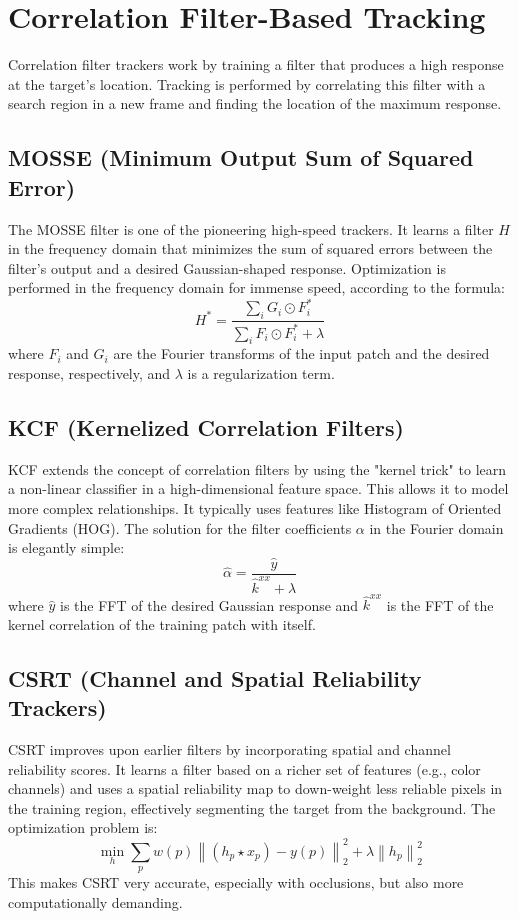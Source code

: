 \documentclass[12pt, a4paper]{report}
\begin{document}
\section{Correlation Filter-Based Tracking}
Correlation filter trackers work by training a filter that produces a high response at the target's location. Tracking is performed by correlating this filter with a search region in a new frame and finding the location of the maximum response.

\subsection{MOSSE (Minimum Output Sum of Squared Error)}
The MOSSE filter is one of the pioneering high-speed trackers. It learns a filter $H$ in the frequency domain that minimizes the sum of squared errors between the filter's output and a desired Gaussian-shaped response. Optimization is performed in the frequency domain for immense speed, according to the formula:
$$ H^* = \frac{\sum_{i} G_i \odot F_i^*}{\sum_{i} F_i \odot F_i^* + \lambda} $$
where $F_i$ and $G_i$ are the Fourier transforms of the input patch and the desired response, respectively, and $\lambda$ is a regularization term.

\subsection{KCF (Kernelized Correlation Filters)}
KCF extends the concept of correlation filters by using the "kernel trick" to learn a non-linear classifier in a high-dimensional feature space. This allows it to model more complex relationships. It typically uses features like Histogram of Oriented Gradients (HOG). The solution for the filter coefficients $\alpha$ in the Fourier domain is elegantly simple:
$$ \hat{\alpha} = \frac{\hat{y}}{\hat{k}^{xx} + \lambda} $$
where $\hat{y}$ is the FFT of the desired Gaussian response and $\hat{k}^{xx}$ is the FFT of the kernel correlation of the training patch with itself.

\subsection{CSRT (Channel and Spatial Reliability Trackers)}
CSRT improves upon earlier filters by incorporating spatial and channel reliability scores. It learns a filter based on a richer set of features (e.g., color channels) and uses a spatial reliability map to down-weight less reliable pixels in the training region, effectively segmenting the target from the background. The optimization problem is:
$$ \min_{h} \sum_{p} w(p) \left\| (h_p \star x_p) - y(p) \right\|^2_2 + \lambda \left\| h_p \right\|^2_2 $$
This makes CSRT very accurate, especially with occlusions, but also more computationally demanding.
\end{document}
